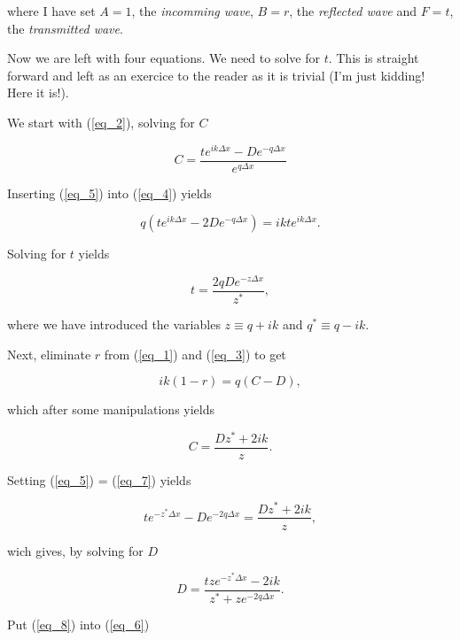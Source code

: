 \documentclass{article}
\begin{document}
where I have set $A = 1$, the \textit{incomming wave}, $B = r$, the \textit{reflected wave} and  $F = t$, the \textit{transmitted wave}.

Now we are left with four equations. We need to solve for $t$. This is straight forward and left as an exercice to the reader as it is trivial (I'm just kidding! Here it is!).

We start with (\ref{eq_2}), solving for $C$

\begin{equation}
C = \frac{te^{ik\Delta x}-De^{-q\Delta x}}{e^{q\Delta x}} \label{eq_5}
\end{equation}

Inserting (\ref{eq_5}) into (\ref{eq_4}) yields

\begin{equation}
q(te^{ik\Delta x} - 2De^{-q\Delta x}) = ikte^{ik\Delta x}.
\end{equation}

Solving for $t$ yields

\begin{equation}
    t = \frac{2qDe^{-z\Delta x}}{z^*}, \label{eq_6}
\end{equation}

where we have introduced the variables $z \equiv q + ik$ and $q^* \equiv q - ik$.

Next, eliminate $r$ from (\ref{eq_1}) and (\ref{eq_3}) to get

\begin{equation}
ik(1 - r) = q(C - D),
\end{equation}

which after some manipulations yields

\begin{equation}
C = \frac{Dz^* + 2ik}{z} \label{eq_7}.
\end{equation}

Setting (\ref{eq_5}) = (\ref{eq_7}) yields

\begin{equation}
te^{-z^*\Delta x} - De^{-2q\Delta x} = \frac{Dz^* + 2ik}{z},
\end{equation}

wich gives, by solving for $D$

\begin{equation}
D = \frac{tze^{-z^*\Delta x} - 2ik}{z^* + ze^{-2q\Delta x}} \label{eq_8}.
\end{equation}

Put (\ref{eq_8}) into (\ref{eq_6})
\end{document}
